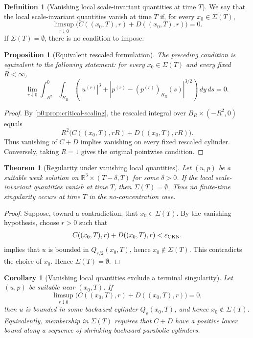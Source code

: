 \documentclass[11pt]{amsart}
\theoremstyle{plain}
\newtheorem{theorem}{Theorem}[section]
\newtheorem{proposition}[proposition]{Proposition}
\newtheorem{corollary}[corollary]{Corollary}
\theoremstyle{definition}
\newtheorem{definition}[definition]{Definition}
\theoremstyle{remark}
\numberwithin{equation}{section}
\begin{document}
\begin{definition}[Vanishing local scale-invariant quantities at time \(T\)]
We say that the local scale-invariant quantities vanish at time \(T\) if, for
every \(x_0\in\Sigma(T)\),
\[
  \limsup_{r\downarrow0}
  \bigl(C((x_0,T),r)+D((x_0,T),r)\bigr)=0.
\]
If \(\Sigma(T)=\emptyset\), there is no condition to impose.
\end{definition}

\begin{proposition}[Equivalent rescaled formulation]
\label{p0:prop:vanishing-rescaled}
The preceding condition is equivalent to the following statement: for every
\(x_0\in\Sigma(T)\) and every fixed \(R<\infty\),
\[
  \lim_{r\downarrow0}
  \int_{-R^2}^{0}\int_{B_R}
  \left(
  |u^{(r)}|^3+
  |p^{(r)}-(p^{(r)})_{B_R}(s)|^{3/2}
  \right)\,dy\,ds=0.
\]
\end{proposition}

\begin{proof}
By \cref{p0:prop:critical-scaling}, the rescaled integral over
\(B_R\times(-R^2,0)\) equals
\[
  R^2\bigl(C((x_0,T),rR)+D((x_0,T),rR)\bigr).
\]
Thus vanishing of \(C+D\) implies vanishing on every fixed rescaled cylinder.
Conversely, taking \(R=1\) gives the original pointwise condition.
\end{proof}

\begin{theorem}[Regularity under vanishing local quantities]\label{p0:thm:no-concentration}
Let \((u,p)\) be a suitable weak solution on
\(\mathbb R^3\times(T-\delta,T)\) for some \(\delta>0\).  If the local
scale-invariant quantities vanish at time \(T\), then
\(\Sigma(T)=\emptyset\).  Thus no finite-time singularity occurs at time \(T\)
in the no-concentration case.
\end{theorem}

\begin{proof}
Suppose, toward a contradiction, that \(x_0\in\Sigma(T)\).  By the vanishing
hypothesis, choose \(r>0\) such that
\[
  C((x_0,T),r)+D((x_0,T),r)<\varepsilon_{\rm CKN}.
\]
 implies that \(u\) is bounded in \(Q_{r/2}(x_0,T)\), hence
\(x_0\notin\Sigma(T)\).  This contradicts the choice of \(x_0\).  Hence
\(\Sigma(T)=\emptyset\).
\end{proof}

\begin{corollary}[Vanishing local quantities exclude a terminal singularity]
\label{p0:cor:escape}
Let \((u,p)\) be suitable near \((x_0,T)\).  If
\[
  \limsup_{r\downarrow0}
  \bigl(C((x_0,T),r)+D((x_0,T),r)\bigr)=0,
\]
then \(u\) is bounded in some backward cylinder \(Q_\rho(x_0,T)\), and hence
\(x_0\notin\Sigma(T)\).  Equivalently, membership in \(\Sigma(T)\) requires
that \(C+D\) have a positive lower bound along a sequence of shrinking backward
parabolic cylinders.
\end{corollary}
\end{document}
